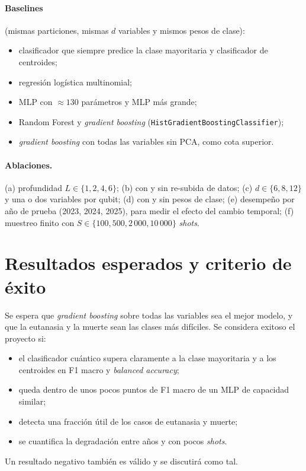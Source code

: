 \documentclass[11pt,letterpaper]{article}
\begin{document}
\paragraph{Baselines} (mismas particiones, mismas $d$ variables y mismos pesos de clase):
\begin{itemize}[leftmargin=*]
\item clasificador que siempre predice la clase mayoritaria y clasificador de centroides;
\item regresión logística multinomial;
\item MLP con $\approx130$ parámetros y MLP más grande;
\item Random Forest y \emph{gradient boosting} (\texttt{HistGradientBoostingClassifier});
\item \emph{gradient boosting} con todas las variables sin PCA, como cota superior.
\end{itemize}

\paragraph{Ablaciones.}
(a) profundidad $L\in\{1,2,4,6\}$;
(b) con y sin re-subida de datos;
(c) $d\in\{6,8,12\}$ y una o dos variables por qubit;
(d) con y sin pesos de clase;
(e) desempeño por año de prueba (2023, 2024, 2025), para medir el efecto del cambio temporal;
(f) muestreo finito con $S\in\{100,500,2\,000,10\,000\}$ \emph{shots}.

\section{Resultados esperados y criterio de éxito}
Se espera que \emph{gradient boosting} sobre todas las variables sea el mejor modelo, y que la
eutanasia y la muerte sean las clases más difíciles. Se considera exitoso el proyecto si:
\begin{itemize}[leftmargin=*]
\item el clasificador cuántico supera claramente a la clase mayoritaria y a los centroides en F1 macro
y \emph{balanced accuracy};
\item queda dentro de unos pocos puntos de F1 macro de un MLP de capacidad similar;
\item detecta una fracción útil de los casos de eutanasia y muerte;
\item se cuantifica la degradación entre años y con pocos \emph{shots}.
\end{itemize}
Un resultado negativo también es válido y se discutirá como tal.
\end{document}
